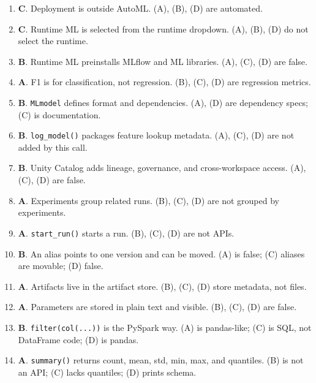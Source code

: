 \documentclass[11pt]{article}
\begin{document}
\begin{enumerate}[leftmargin=*, label=\textbf{Q\arabic*.}]
		\item \textbf{C}. Deployment is outside AutoML. (A), (B), (D) are automated.
		
		\item \textbf{C}. Runtime ML is selected from the runtime dropdown. (A), (B), (D) do not select the runtime.
		
		\item \textbf{B}. Runtime ML preinstalls MLflow and ML libraries. (A), (C), (D) are false.
		
		\item \textbf{A}. F1 is for classification, not regression. (B), (C), (D) are regression metrics.
		
		\item \textbf{B}. \texttt{MLmodel} defines format and dependencies. (A), (D) are dependency specs; (C) is documentation.
		
		\item \textbf{B}. \texttt{log\_model()} packages feature lookup metadata. (A), (C), (D) are not added by this call.
		
		\item \textbf{B}. Unity Catalog adds lineage, governance, and cross-workspace access. (A), (C), (D) are false.
		
		\item \textbf{A}. Experiments group related runs. (B), (C), (D) are not grouped by experiments.
		
		\item \textbf{A}. \texttt{start\_run()} starts a run. (B), (C), (D) are not APIs.
		
		\item \textbf{B}. An alias points to one version and can be moved. (A) is false; (C) aliases are movable; (D) false.
		
		\item \textbf{A}. Artifacts live in the artifact store. (B), (C), (D) store metadata, not files.
		
		\item \textbf{A}. Parameters are stored in plain text and visible. (B), (C), (D) are false.
		
		\item \textbf{B}. \texttt{filter(col(...))} is the PySpark way. (A) is pandas-like; (C) is SQL, not DataFrame code; (D) is pandas.
		
		\item \textbf{A}. \texttt{summary()} returns count, mean, std, min, max, and quantiles. (B) is not an API; (C) lacks quantiles; (D) prints schema.
		

\end{enumerate}
\end{document}
